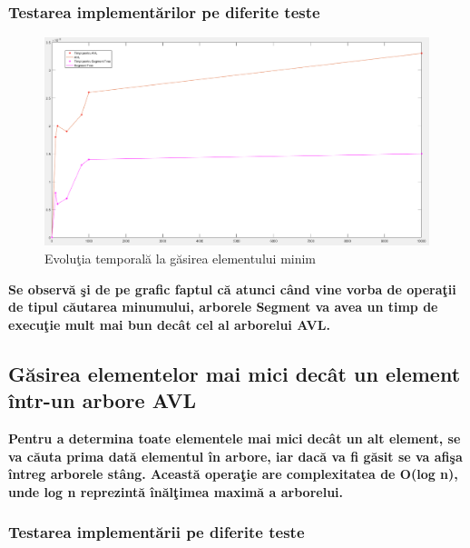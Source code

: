 \documentclass[12pt]{article}
\begin{document}
\subsubsection{Testarea implement\u{a}rilor pe diferite teste}

\begin{figure}[H]
\centering
\includegraphics[scale = 0.4]{Min.png}
\caption{Evolu\c{t}ia temporal\u{a} la g\u{a}sirea elementului minim}
\end{figure}

\textbf{\hspace{7mm} Se observ\u{a} \c{s}i de pe grafic faptul c\u{a} atunci c\^{a}nd vine vorba de opera\c{t}ii de tipul c\u{a}utarea minumului, arborele Segment va avea un timp de execu\c{t}ie mult mai bun dec\^{a}t cel al arborelui AVL.}
\subsection{G\u{a}sirea elementelor mai mici dec\^{a}t un element \^{i}ntr-un arbore AVL}

\textbf{\hspace{7mm}Pentru a determina toate elementele mai mici dec\^{a}t un alt element, se va c\u{a}uta prima dat\u{a} elementul \^{i}n arbore, iar dac\u{a} va fi g\u{a}sit se va afi\c{s}a \^{i}ntreg arborele st\^{a}ng. Aceast\u{a} opera\c{t}ie are complexitatea de O(log n), unde log n reprezint\u{a} \^{i}n\u{a}l\c{t}imea maxim\u{a} a arborelui.}

\subsubsection{Testarea implement\u{a}rii pe diferite teste}
\end{document}
